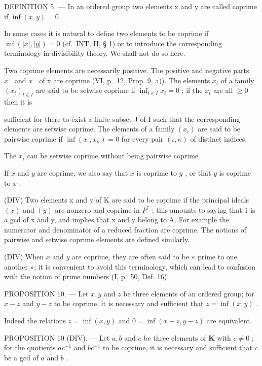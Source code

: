 DEFINITION 5. --- In an ordered group two elements x and y are called coprime if \(\inf(x, y) = 0\) .

In some cases it is natural to define two elements to be coprime if \(\inf(|x|, |y|) = 0\) (cf.~INT, II, § 1) or to introduce the corresponding terminology in divisibility theory. We shall not do so here.

Two coprime elements are necessarily positive. The positive and negative parts \(x^{+}\) and \(x^{-}\) of x are coprime (VI, p.~12, Prop. 9, a)). The elements \(x_{i}\) of a family \((x_{t})_{t\in I}\) are said to be setwise coprime if \(\inf_{t\in I}x_t = 0\) ; if the \(x_{t}\) are all \(\geqslant 0\) then it is

sufficient for there to exist a finite subset J of I such that the corresponding elements are setwise coprime. The elements of a family \((x_{\iota})\) are said to be pairwise coprime if \(\inf(x_{\iota}, x_{\kappa}) = 0\) for every pair \((\iota, \kappa)\) of distinct indices.

The \(x_{i}\) can be setwise coprime without being pairwise coprime.

If \(x\) and \(y\) are coprime, we also say that \(x\) is coprime to \(y\) , or that \(y\) is coprime to \(x\) .

(DIV) Two elements x and y of K are said to be coprime if the principal ideals \((x)\) and \((y)\) are nonzero and coprime in \(P^{*}\) ; this amounts to saying that 1 is a gcd of x and y, and implies that x and y belong to A. For example the numerator and denominator of a reduced fraction are coprime. The notions of pairwise and setwise coprime elements are defined similarly.

(DIV) When \(x\) and \(y\) are coprime, they are often said to be « prime to one another »; it is convenient to avoid this terminology, which can lead to confusion with the notion of prime numbers (I, p.~50, Def. 16).

PROPOSITION 10. --- Let \(x, y\) and \(z\) be three elements of an ordered group; for \(x - z\) and \(y - z\) to be coprime, it is necessary and sufficient that \(z = \inf(x, y)\) .

Indeed the relations \(z = \inf (x, y)\) and \(0 = \inf (x - z, y - z)\) are equivalent.

PROPOSITION 10 (DIV). --- Let \(a, b\) and \(c\) be three elements of \(\mathbf{K}\) with \(c \neq 0\) ; for the quotients \(ac^{-1}\) and \(bc^{-1}\) to be coprime, it is necessary and sufficient that \(c\) be a gcd of \(a\) and \(b\) .

